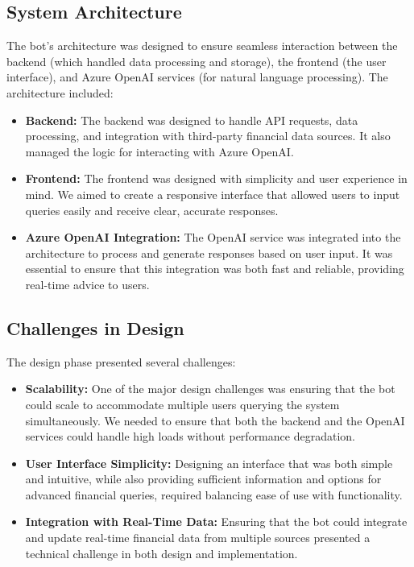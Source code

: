\documentclass[a4paper,12pt]{report}
\begin{document}
\subsection*{System Architecture}
The bot's architecture was designed to ensure seamless interaction between the backend (which handled data processing and storage), the frontend (the user interface), and Azure OpenAI services (for natural language processing). The architecture included:
\begin{itemize}
    \item \textbf{Backend:} The backend was designed to handle API requests, data processing, and integration with third-party financial data sources. It also managed the logic for interacting with Azure OpenAI.
    \item \textbf{Frontend:} The frontend was designed with simplicity and user experience in mind. We aimed to create a responsive interface that allowed users to input queries easily and receive clear, accurate responses.
    \item \textbf{Azure OpenAI Integration:} The OpenAI service was integrated into the architecture to process and generate responses based on user input. It was essential to ensure that this integration was both fast and reliable, providing real-time advice to users.
\end{itemize}

\subsection*{Challenges in Design}
The design phase presented several challenges:
\begin{itemize}
    \item \textbf{Scalability:} One of the major design challenges was ensuring that the bot could scale to accommodate multiple users querying the system simultaneously. We needed to ensure that both the backend and the OpenAI services could handle high loads without performance degradation.
    \item \textbf{User Interface Simplicity:} Designing an interface that was both simple and intuitive, while also providing sufficient information and options for advanced financial queries, required balancing ease of use with functionality.
    \item \textbf{Integration with Real-Time Data:} Ensuring that the bot could integrate and update real-time financial data from multiple sources presented a technical challenge in both design and implementation.
\end{itemize}
\end{document}
